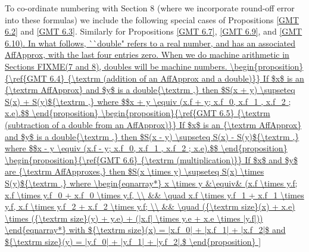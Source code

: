 To co-ordinate numbering with Section 8 (where we incorporate round-off error into these formulas) we include the following special
cases of Propositions \ref{GMT 6.2} and \ref{GMT 6.3}.  Similarly for Propositions \ref{GMT 6.7}, \ref{GMT 6.9}, and \ref{GMT 6.10). 

In what follows,  ``double" refers to a real number, and has an associated AffApprox, with the last four entries zero.  When we do
machine arithmetic in Sections FIXME(7 and 8), doubles will be  machine numbers.

\begin{proposition}{\ref{GMT 6.4} {\textrm (addition of an AffApprox and a double)}} If $x$ is an {\textrm AffApprox}  and $y$ is a double{\textrm ,}
 then $S(x +
y)
\supseteq S(x) + S(y)${\textrm ,} where
$$x + y \equiv (x.f + y; x.f_0, x.f_1 , x.f_2 ; x.e).$$ 
\end{proposition}

\begin{proposition}{\ref{GMT 6.5} {\textrm (subtraction of a double from an AffApprox)}}  If $x$ is an {\textrm AffApprox} and $y$ is a double{\textrm ,}
 then
$S(x - y)
\supseteq S(x) - S(y)${\textrm ,} where
$$x - y \equiv (x.f - y; x.f_0, x.f_1 , x.f_2 ; x.e).$$ 
\end{proposition}

\begin{proposition}{\ref{GMT 6.6} {\textrm (multiplication)}}  If $x$ and $y$ are {\textrm AffApproxes,}
 then $S(x \times y) \supseteq S(x) \times
S(y)${\textrm ,} where
\begin{eqnarray*}
x \times y &\equiv& (x.f \times y.f; x.f \times y.f_0 + x.f_0 \times y.f, \\
&& \quad
x.f \times y.f_1 + x.f_1 \times y.f, x.f \times y.f_2 + x.f_2 \times y.f; 
\\
&& \quad
({\textrm size}(x) + x.e) \times ({\textrm size}(y) + y.e) + (|x.f| \times y.e + x.e \times |y.f|))
                                            \end{eqnarray*}
 with ${\textrm size}(x) = |x.f_0| + |x.f_1| + |x.f_2|$ and ${\textrm size}(y) = |y.f_0| + |y.f_1| + |y.f_2|.$
\end{proposition}

}
